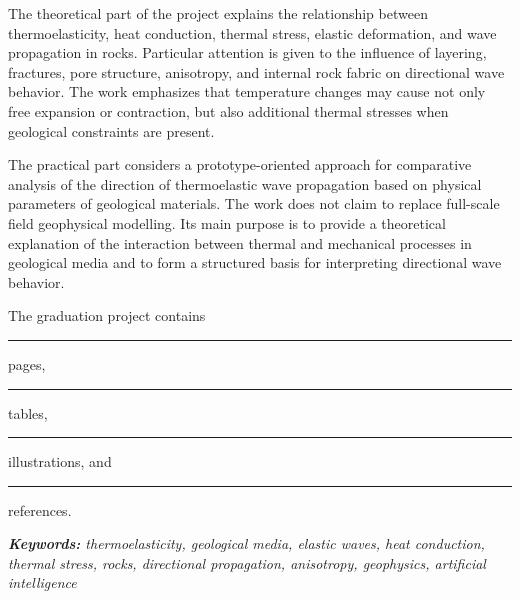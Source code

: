 The theoretical part of the project explains the relationship between thermoelasticity, heat conduction, thermal stress, elastic deformation, and wave propagation in rocks. Particular attention is given to the influence of layering, fractures, pore structure, anisotropy, and internal rock fabric on directional wave behavior. The work emphasizes that temperature changes may cause not only free expansion or contraction, but also additional thermal stresses when geological constraints are present.

The practical part considers a prototype-oriented approach for comparative analysis of the direction of thermoelastic wave propagation based on physical parameters of geological materials. The work does not claim to replace full-scale field geophysical modelling. Its main purpose is to provide a theoretical explanation of the interaction between thermal and mechanical processes in geological media and to form a structured basis for interpreting directional wave behavior.

The graduation project contains \rule{1cm}{0.1pt} pages, \rule{1cm}{0.1pt} tables, \rule{1cm}{0.1pt} illustrations, and \rule{1cm}{0.1pt} references.

\vspace{5mm}
\noindent\textit{\textbf{Keywords:} thermoelasticity, geological media, elastic waves, heat conduction, thermal stress, rocks, directional propagation, anisotropy, geophysics, artificial intelligence}
